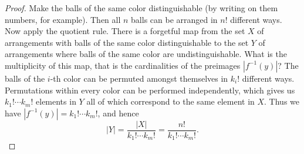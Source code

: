 

\setcounter{section}{4}
\setcounter{subsection}{2}
\setcounter{dfn}{1}

\begin{proof}
Make the balls of the same color distinguishable (by writing on them numbers, for example).
Then all $n$ balls can be arranged in $n!$ different ways.
Now apply the quotient rule.
There is a forgetful map from the set $X$ of arrangements with balls of the same color distinguishable
to the set $Y$ of arrangements where balls of the same color are undistinguishable.
What is the multiplicity of this map, that is the cardinalities of the preimages $|f^{-1}(y)|$?
The balls of the $i$-th color can be permuted amongst themselves in $k_i!$ different ways.
Permutations within every color can be performed independently, which gives us $k_1! \cdots k_m!$ elements in $Y$
all of which correspond to the same element in $X$.
Thus we have $|f^{-1}(y)| = k_1! \cdots k_m!$, and hence
\[
|Y| = \frac{|X|}{k_1! \cdots k_m!} = \frac{n!}{k_1! \cdots k_m!}.
\]
\end{proof}




